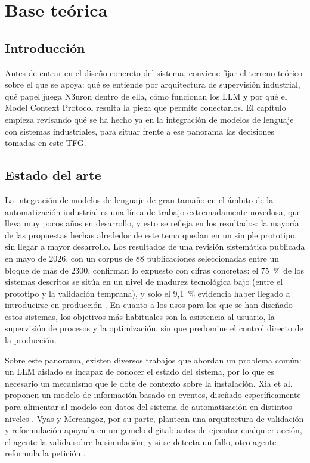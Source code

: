 \chapter{Base teórica}
\label{cha:base-teorica}

\section{Introducción}
\label{sec:intro-base-teorica}

Antes de entrar en el diseño concreto del sistema, conviene fijar el terreno
teórico sobre el que se apoya: qué se entiende por arquitectura de
supervisión industrial, qué papel juega N3uron dentro de ella, cómo
funcionan los LLM y por qué el Model Context Protocol resulta la pieza que
permite conectarlos. El capítulo empieza revisando qué se ha hecho ya en la
integración de modelos de lenguaje con sistemas industriales, para situar
frente a ese panorama las decisiones tomadas en este TFG.

\section{Estado del arte}
\label{sec:estado-arte}

La integración de modelos de lenguaje de gran tamaño en el ámbito de la automatización
industrial es una línea de trabajo extremadamente novedosa, que lleva muy pocos años en
desarrollo, y esto se refleja en los resultados: la mayoría de las propuestas hechas
alrededor de este tema quedan en un simple prototipo, sin llegar a mayor desarrollo. Los
resultados de una revisión sistemática publicada en mayo de 2026, con un corpus de 88
publicaciones seleccionadas entre un bloque de más de 2300, confirman lo expuesto con
cifras concretas: el 75~\% de los sistemas descritos se sitúa en un nivel de madurez
tecnológica bajo (entre el prototipo y la validación temprana), y solo el 9,1~\%
evidencia haber llegado a introducirse en producción \cite{henkel2026}. En cuanto a los
usos para los que se han diseñado estos sistemas, los objetivos más habituales son la
asistencia al usuario, la supervisión de procesos y la optimización, sin que predomine
el control directo de la producción.

Sobre este panorama, existen diversos trabajos que abordan un problema común: un LLM
aislado es incapaz de conocer el estado del sistema, por lo que es necesario un
mecanismo que le dote de contexto sobre la instalación. Xia et al. proponen un modelo de
información basado en eventos, diseñado específicamente para alimentar al modelo con
datos del sistema de automatización en distintos niveles \cite{xia2024}. Vyas y
Mercangöz, por su parte, plantean una arquitectura de validación y reformulación apoyada
en un gemelo digital: antes de ejecutar cualquier acción, el agente la valida sobre la
simulación, y si se detecta un fallo, otro agente reformula la petición
\cite{vyas-mercangoz}.

